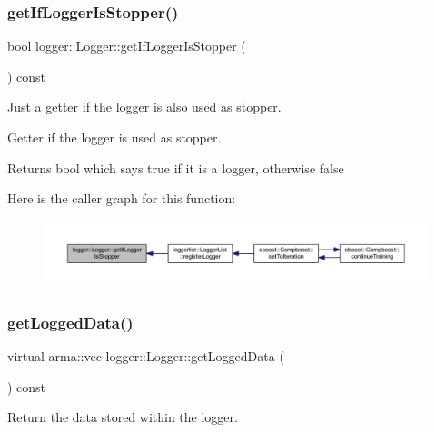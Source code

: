 \subsubsection{\texorpdfstring{get\+If\+Logger\+Is\+Stopper()}{getIfLoggerIsStopper()}}
{\footnotesize\ttfamily bool logger\+::\+Logger\+::get\+If\+Logger\+Is\+Stopper (\begin{DoxyParamCaption}{ }\end{DoxyParamCaption}) const}



Just a getter if the logger is also used as stopper. 

Getter if the logger is used as stopper.

\begin{DoxyReturn}{Returns}
{\ttfamily bool} which says {\ttfamily true} if it is a logger, otherwise {\ttfamily false} 
\end{DoxyReturn}
Here is the caller graph for this function\+:
\nopagebreak
\begin{figure}[H]
\begin{center}
\leavevmode
\includegraphics[width=350pt]{classlogger_1_1_logger_ae39cfa15ba833840ae52889c09cac994_icgraph}
\end{center}
\end{figure}
\mbox{\label{classlogger_1_1_logger_aa4fc254c532172db3404b7c0bcd17092}} 
\subsubsection{\texorpdfstring{get\+Logged\+Data()}{getLoggedData()}}
{\footnotesize\ttfamily virtual arma\+::vec logger\+::\+Logger\+::get\+Logged\+Data (\begin{DoxyParamCaption}{ }\end{DoxyParamCaption}) const\hspace{0.3cm}{\ttfamily [pure virtual]}}



Return the data stored within the logger. 



